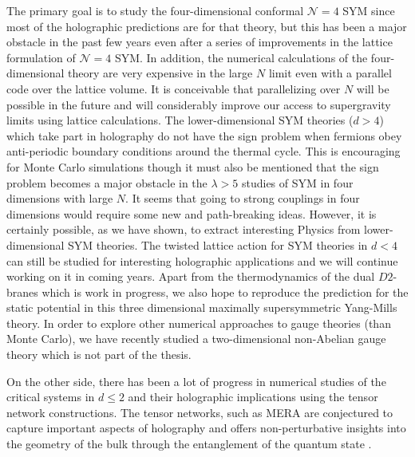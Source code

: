 The primary goal is to study the four-dimensional conformal $\mathcal{N}=4$ SYM 
since most of the holographic predictions are for that theory, but this has been a major obstacle
in the past few years even after a series of improvements in the lattice formulation of $\mathcal{N}=4$ SYM. 
In addition, the numerical calculations of the four-dimensional theory are very expensive in the 
large $N$ limit even with a parallel code over the lattice volume. It is conceivable that
parallelizing over $N$ will be possible in the future and will considerably improve our access to 
supergravity limits using lattice calculations. 
The lower-dimensional SYM theories ($d > 4$) which take part in holography do not 
have the sign problem when fermions obey anti-periodic boundary conditions around the thermal
cycle. This is encouraging for Monte Carlo simulations though it must also be mentioned that the sign problem 
becomes a major obstacle in the $\lambda > 5$ studies of SYM in four dimensions with large $N$. 
It seems that going to strong couplings in four dimensions would require some new and path-breaking ideas. 
However, it is certainly possible, as we have shown, to extract interesting Physics from 
lower-dimensional SYM theories. The twisted lattice action for SYM theories in $d <4$ can still 
be studied for interesting holographic applications and 
we will continue working on it in coming years. Apart from the thermodynamics of the dual 
$D2$-branes which is work in progress, we also hope to reproduce the prediction for the static 
potential in this three dimensional maximally supersymmetric Yang-Mills theory. In order to 
explore other numerical approaches to gauge theories (than Monte Carlo), 
we have recently studied a two-dimensional non-Abelian gauge theory \cite{Bazavov:2019qih}
which is not part of the thesis.  

On the other side, there has been a lot of progress in numerical studies of
the critical systems in $d \le 2$ and their holographic implications using the 
tensor network constructions. The tensor networks, such as MERA \cite{2008PhRvL.101k0501V} 
are conjectured to capture important aspects of holography and offers non-perturbative 
insights into the geometry of the bulk through the entanglement of the quantum state 
\cite{Swingle:2009bg, 2015PhRvL.115t0401E, 2011JSP...145..891E, 
2018RvMP...90c5007N, VanRaamsdonk:2009ar, Headrick:2018ctr}.

